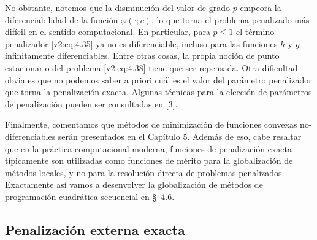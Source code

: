 No obstante, notemos que la disminución del valor de grado $p$ empeora la diferenciabilidad de la función $\varphi(\cdot; c)$, lo que torna el problema penalizado más difícil en el sentido computacional. En particular, para $p \le 1$ el término penalizador \eqref{v2:eq:4.35} ya no es diferenciable, incluso para las funciones $h$ y $g$ infinitamente diferenciables. Entre otras cosas, la propia noción de punto estacionario del problema \eqref{v2:eq:4.38} tiene que ser repensada. Otra dificultad obvia es que no podemos saber a priori cuál es el valor del parámetro penalizador que torna la penalización exacta. Algunas técnicas para la elección de parámetros de penalización pueden ser consultadas en [3].

Finalmente, comentamos que métodos de minimización de funciones convexas no-diferenciables serán presentados en el Capítulo 5. Además de eso, cabe resaltar que en la práctica computacional moderna, funciones de penalización exacta típicamente son utilizadas como funciones de mérito para la globalización de métodos locales, y no para la resolución directa de problemas penalizados. Exactamente así vamos a desenvolver la globalización de métodos de programación cuadrática secuencial en \S~4.6.

\subsection{Penalización externa exacta}\label{v2:sec:4.3.2}

